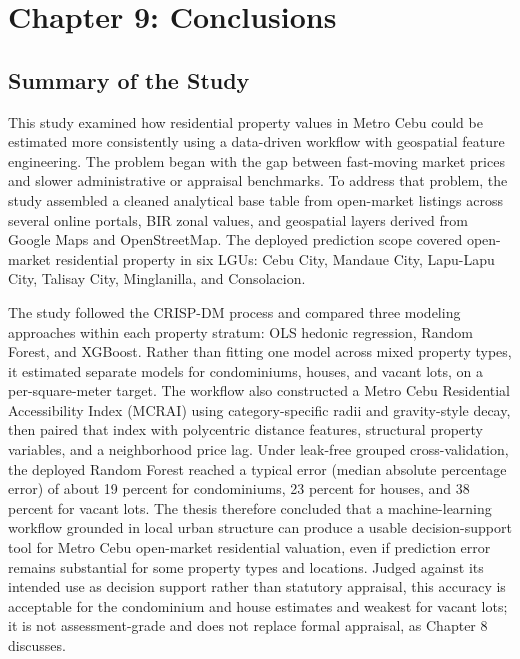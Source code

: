 \section{Chapter 9: Conclusions}\label{conclusions}

\subsection{Summary of the Study}\label{summary-of-the-study}

This study examined how residential property values in Metro Cebu could be estimated more consistently using a data-driven workflow with geospatial feature engineering. The problem began with the gap between fast-moving market prices and slower administrative or appraisal benchmarks. To address that problem, the study assembled a cleaned analytical base table from open-market listings across several online portals, BIR zonal values, and geospatial layers derived from Google Maps and OpenStreetMap. The deployed prediction scope covered open-market residential property in six LGUs: Cebu City, Mandaue City, Lapu-Lapu City, Talisay City, Minglanilla, and Consolacion.

The study followed the CRISP-DM process and compared three modeling approaches within each property stratum: OLS hedonic regression, Random Forest, and XGBoost. Rather than fitting one model across mixed property types, it estimated separate models for condominiums, houses, and vacant lots, on a per-square-meter target. The workflow also constructed a Metro Cebu Residential Accessibility Index (MCRAI) using category-specific radii and gravity-style decay, then paired that index with polycentric distance features, structural property variables, and a neighborhood price lag. Under leak-free grouped cross-validation, the deployed Random Forest reached a typical error (median absolute percentage error) of about 19 percent for condominiums, 23 percent for houses, and 38 percent for vacant lots. The thesis therefore concluded that a machine-learning workflow grounded in local urban structure can produce a usable decision-support tool for Metro Cebu open-market residential valuation, even if prediction error remains substantial for some property types and locations. Judged against its intended use as decision support rather than statutory appraisal, this accuracy is acceptable for the condominium and house estimates and weakest for vacant lots; it is not assessment-grade and does not replace formal appraisal, as Chapter 8 discusses.

